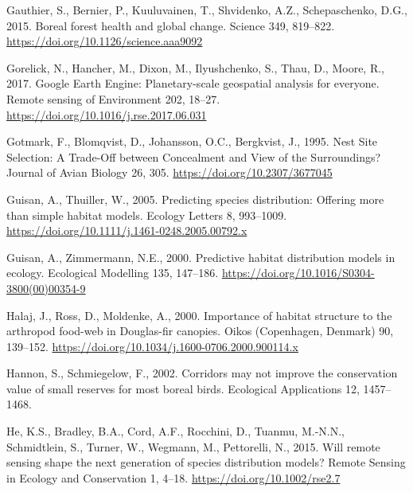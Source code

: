 \documentclass[
]{article}
\newlength{\cslhangindent}
\newlength{\cslentryspacingunit} %
\newenvironment{CSLReferences}[2] %
 {%
  \setlength{\parindent}{0pt}
  \ifodd #1
  \let\oldpar\par
  \def\par{\hangindent=\cslhangindent\oldpar}
  \fi
  \setlength{\parskip}{#2\cslentryspacingunit}
 }%
 {}
\begin{document}
\begin{CSLReferences}{1}{0}
\leavevmode{}%
Gauthier, S., Bernier, P., Kuuluvainen, T., Shvidenko, A.Z., Schepaschenko, D.G., 2015. Boreal forest health and global change. Science 349, 819--822. \url{https://doi.org/10.1126/science.aaa9092}

\leavevmode{}%
Gorelick, N., Hancher, M., Dixon, M., Ilyushchenko, S., Thau, D., Moore, R., 2017. Google {Earth} {Engine}: {Planetary}-scale geospatial analysis for everyone. Remote sensing of Environment 202, 18--27. \url{https://doi.org/10.1016/j.rse.2017.06.031}

\leavevmode{}%
Gotmark, F., Blomqvist, D., Johansson, O.C., Bergkvist, J., 1995. Nest {Site} {Selection}: {A} {Trade}-{Off} between {Concealment} and {View} of the {Surroundings}? Journal of Avian Biology 26, 305. \url{https://doi.org/10.2307/3677045}

\leavevmode{}%
Guisan, A., Thuiller, W., 2005. Predicting species distribution: Offering more than simple habitat models. Ecology Letters 8, 993--1009. \url{https://doi.org/10.1111/j.1461-0248.2005.00792.x}

\leavevmode{}%
Guisan, A., Zimmermann, N.E., 2000. Predictive habitat distribution models in ecology. Ecological Modelling 135, 147--186. \url{https://doi.org/10.1016/S0304-3800(00)00354-9}

\leavevmode{}%
Halaj, J., Ross, D., Moldenke, A., 2000. Importance of habitat structure to the arthropod food-web in {Douglas}-fir canopies. Oikos (Copenhagen, Denmark) 90, 139--152. \url{https://doi.org/10.1034/j.1600-0706.2000.900114.x}

\leavevmode{}%
Hannon, S., Schmiegelow, F., 2002. Corridors may not improve the conservation value of small reserves for most boreal birds. Ecological Applications 12, 1457--1468.

\leavevmode{}%
He, K.S., Bradley, B.A., Cord, A.F., Rocchini, D., Tuanmu, M.-N.N., Schmidtlein, S., Turner, W., Wegmann, M., Pettorelli, N., 2015. Will remote sensing shape the next generation of species distribution models? Remote Sensing in Ecology and Conservation 1, 4--18. \url{https://doi.org/10.1002/rse2.7}


\end{CSLReferences}
\end{document}
